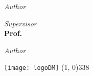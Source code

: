 \begin{titlepage}
\begin{center}
{\begin{large}
    \vspace*{-4.23cm} 

    \begin{flushright}
    \textit{Author}\\ 
    \vspace{5pt} 
    \textbf{\myName}
    \end{flushright}
    \end{large}
}{
    \begin{large}
    \begin{flushleft}
    \textit{Supervisor}\\ 
    \vspace{5pt} 
    \textbf{Prof. \mySupervisor}
    \end{flushleft}

    \vspace*{-2.36cm} 

    \begin{flushright}
    \textit{Author}\\ 
    \vspace{5pt} 
    \textbf{\myName}
    \end{flushright}
    \end{large}
}

\vfill
\texttt{[image: logoDM]}
\line(1, 0){338} \\
\begin{normalsize}
\textsc{\myTime}
\end{normalsize}

\end{center}
\end{titlepage}
